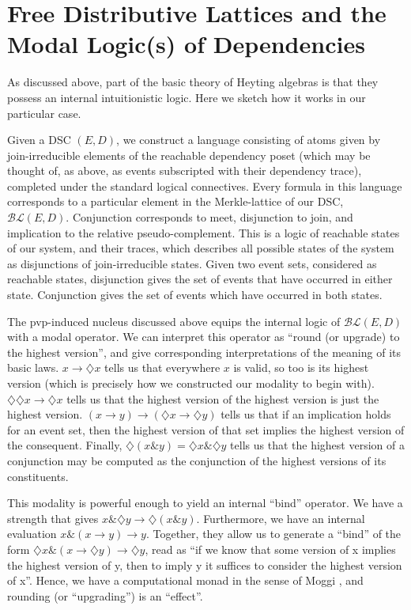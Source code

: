 \documentclass[hoptionsi,review,screen,format=acmsmall]{acmart}
\theoremstyle{definition}
\newcommand{\BLc}{\mathcal{BL}}
\newcommand{\band}{\mathop{\&}}
\newcommand{\Dia}{\diamondsuit}
\begin{document}
\section{Free Distributive Lattices and the Modal Logic(s) of Dependencies}
As discussed above, part of the basic theory of Heyting algebras is that they possess an internal intuitionistic logic. Here we sketch how it works in our particular case.

Given a DSC \((E,D)\), we construct a language consisting of atoms given by join-irreducible elements of the reachable dependency poset (which may be thought of, as above, as events subscripted with their dependency trace), completed under the standard logical connectives. Every formula in this language corresponds to a particular element in the Merkle-lattice of our DSC, \(\BLc(E,D)\).  Conjunction corresponds to meet, disjunction to join, and implication to the relative pseudo-complement. This is a logic of reachable states of our system, and their traces, which describes all possible states of the system as disjunctions of join-irreducible states. Given two event sets, considered as reachable states, disjunction gives the set of events that have occurred in either state. Conjunction gives the set of events which have occurred in both states.


The pvp-induced nucleus discussed above equips the internal logic of \(\BLc(E,D)\) with a modal operator. We can interpret this operator as ``round (or upgrade) to the highest version'', and give corresponding interpretations of the meaning of its basic laws. \(x \rightarrow \Dia{x}\) tells us that everywhere \(x\) is valid, so too is its highest version (which is precisely how we constructed our modality to begin with). \(\Dia\Dia{x} \rightarrow \Dia{x}\) tells us that the highest version of the highest version is just the highest version. \((x \rightarrow y) \rightarrow (\Dia{x} \rightarrow \Dia{y})\)  tells us that if an implication holds for an event set, then the highest version of that set implies the highest version of the consequent. Finally, \(\Dia(x \band y) = \Dia{x} \band \Dia{y}\) tells us that the highest version of a conjunction may be computed as the conjunction of the highest versions of its constituents.

This modality is powerful enough to yield an internal ``bind'' operator. We have a strength that gives \(x \band \Dia{y} \rightarrow \Dia(x \band y)\). Furthermore, we have an internal evaluation \(x \band (x \rightarrow y) \rightarrow y\). Together, they allow us to generate a ``bind'' of the form \(\Dia{x} \band (x \rightarrow \Dia{y}) \rightarrow \Dia{y}\), read as ``if we know that some version of x implies the highest version of y, then to imply y it suffices to consider the highest version of x''. Hence, we have a computational monad in the sense of Moggi \cite{moggi1991notions}, and rounding (or ``upgrading'') is an ``effect''. 
\end{document}

